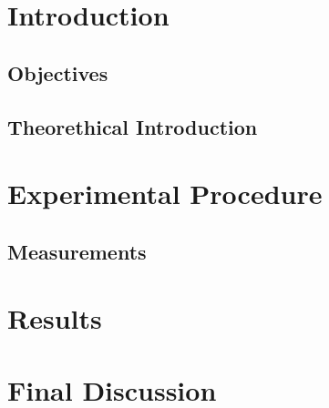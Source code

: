 \documentclass[a4paper,12pt]{article}
\begin{document}
\title{}
\author{Gabriel D'Andrade Furlanetto}
\maketitle
\pagebreak 

\section{Introduction}

\subsection{Objectives}

\subsection{Theorethical Introduction}

\section{Experimental Procedure}

\subsection{Measurements}

\section{Results}

\section{Final Discussion}
\end{document}
